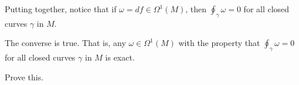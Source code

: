 Putting  together, notice that if $\omega = df \in \Omega^1(M)$, then $\oint_\gamma \omega = 0$ for all closed curves $\gamma$ in $M$.

\begin{proposition}\label{prop:integrate to 0 => exact}
	The converse is true. That is, any $\omega \in \Omega^1(M)$ with the property that $\oint_\gamma \omega = 0$ for all closed curves $\gamma$ in $M$ is exact.
\end{proposition}

\begin{exercise}
	Prove this.
\end{exercise}